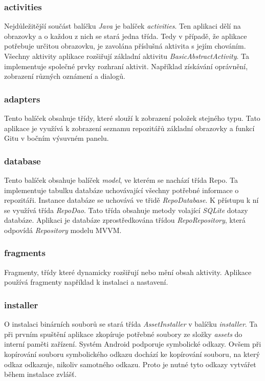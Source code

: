         \subsubsection{activities}
        Nejdůležitější součást balíčku \emph{Java} je balíček \emph{activities}. Ten aplikaci dělí na obrazovky a o každou z nich se stará jedna třída. Tedy v případě, že aplikace potřebuje určitou obrazovku, je zavolána příslušná aktivita s jejím chováním. Všechny aktivity aplikace rozšiřují základní aktivitu \emph{BasicAbstractActivity}. Ta implementuje společné prvky rozhraní aktivit. Například získávání oprávnění, zobrazení různých oznámení a dialogů.

        \subsubsection{adapters}
        Tento balíček obsahuje třídy, které slouží k zobrazení položek stejného typu. Tato aplikace je využívá k zobrazení seznamu repozitářů základní obrazovky a funkcí Gitu v bočním výsuvném panelu.  

        \subsubsection{database}
        Tento balíček obsahuje balíček \emph{model}, ve kterém se nachází třída Repo. Ta implementuje tabulku databáze uchovávající všechny potřebné informace o repozitáři. Instance databáze se uchovává ve třidě \emph{RepoDatabase}. K přístupu k ní se využívá třída \emph{RepoDao}. Tato třída obsahuje metody volající \emph{SQLite} dotazy databáze. Aplikaci je databáze zprostředkována třídou \emph{RepoRepository}, která odpovídá \emph{Repository} modelu MVVM.

        \subsubsection{fragments}
        Fragmenty, třídy které dynamicky rozšiřují nebo mění obsah aktivity. Aplikace používá fragmenty například k instalaci a nastavení.

        \subsubsection{installer}
        O instalaci binárních souborů se stará třída \emph{AssetInstaller} v balíčku \emph{installer}. Ta při prvním spuštění aplikace zkopíruje potřebné soubory ze složky \emph{assets} do interní paměti zařízení. Systém Android podporuje symbolické odkazy. Ovšem při kopírování souboru symbolického odkazu dochází ke kopírování souboru, na který odkaz odkazuje, nikoliv samotného odkazu. Proto je nutné tyto odkazy vytvářet během instalace zvlášť.

